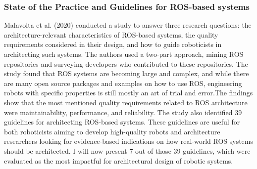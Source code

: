 \documentclass[]{article}
\begin{document}
	\subsubsection{State of the Practice and Guidelines for ROS-based systems}
	Malavolta et al. (2020) conducted a study to answer three research questions: the architecture-relevant characteristics of ROS-based systems, the quality requirements considered in their design, and how to guide roboticists in architecting such systems. The authors used a two-part approach, mining ROS repositories and surveying developers who contributed to these repositories. The study found that ROS systems are becoming large and complex, and while there are many open source packages and examples on how to use ROS, engineering robots with specific properties is still mostly an art of trial and error.The findings show that the most mentioned quality requirements related to ROS architecture were maintainability, performance, and reliability. The study also identified 39 guidelines for architecting ROS-based systems. These guidelines are useful for both roboticists aiming to develop high-quality robots and architecture researchers looking for evidence-based indications on how real-world ROS systems should be architected. I will now present 7 out of those 39 guidelines, which were evaluated as the most impactful for architectural design of robotic systems.
	\autocite{malavoltaHowYouArchitect2020}
\end{document}
